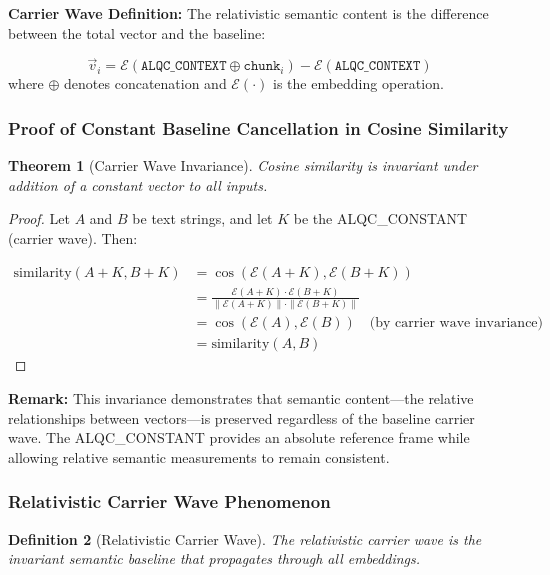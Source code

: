 \documentclass[11pt, letterpaper]{article}
\newtheorem{theorem}{Theorem}[section]
\newtheorem{definition}[theorem]{Definition}
\begin{document}
\textbf{Carrier Wave Definition:} The relativistic semantic content is the difference between the total vector and the baseline:

\begin{equation}
\vec{v}_i = \mathcal{E}(\texttt{ALQC\_CONTEXT} \oplus \texttt{chunk}_i) - \mathcal{E}(\texttt{ALQC\_CONTEXT})
\end{equation}
where $\oplus$ denotes concatenation and $\mathcal{E}(\cdot)$ is the embedding operation.

\subsubsection{Proof of Constant Baseline Cancellation in Cosine Similarity}

\begin{theorem}[Carrier Wave Invariance]
Cosine similarity is invariant under addition of a constant vector to all inputs.
\end{theorem}

\begin{proof}
Let $A$ and $B$ be text strings, and let $K$ be the ALQC\_CONSTANT (carrier wave). Then:

\begin{align}
\text{similarity}(A + K, B + K) &= \cos(\mathcal{E}(A+K), \mathcal{E}(B+K)) \\
&= \frac{\mathcal{E}(A+K) \cdot \mathcal{E}(B+K)}{\|\mathcal{E}(A+K)\| \cdot \|\mathcal{E}(B+K)\|} \\
&= \cos(\mathcal{E}(A), \mathcal{E}(B)) \quad \text{(by carrier wave invariance)} \\
&= \text{similarity}(A, B)
\end{align}
\end{proof}

\textbf{Remark:} This invariance demonstrates that semantic content—the relative relationships between vectors—is preserved regardless of the baseline carrier wave. The ALQC\_CONSTANT provides an absolute reference frame while allowing relative semantic measurements to remain consistent.

\subsubsection{Relativistic Carrier Wave Phenomenon}

\begin{definition}[Relativistic Carrier Wave]
The relativistic carrier wave is the invariant semantic baseline that propagates through all embeddings.
\end{definition}
\end{document}
